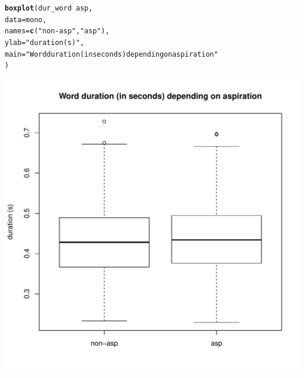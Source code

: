\documentclass[a4paper,11pt]{article}\usepackage[]{graphicx}\usepackage[]{color}
\makeatletter
\def\maxwidth{ %
  \ifdim\Gin@nat@width>\linewidth
    \linewidth
  \else
    \Gin@nat@width
  \fi
}
\newcommand{\hlstr}[1]{\textcolor[rgb]{0.192,0.494,0.8}{#1}}%
\newcommand{\hlopt}[1]{\textcolor[rgb]{0,0,0}{#1}}%
\newcommand{\hlstd}[1]{\textcolor[rgb]{0.345,0.345,0.345}{#1}}%
\newcommand{\hlkwc}[1]{\textcolor[rgb]{0.333,0.667,0.333}{#1}}%
\newcommand{\hlkwd}[1]{\textcolor[rgb]{0.737,0.353,0.396}{\textbf{#1}}}%
\newenvironment{kframe}{%
 \def\at@end@of@kframe{}%
 \ifinner\ifhmode%
  \def\at@end@of@kframe{\end{minipage}}%
  \begin{minipage}{\columnwidth}%
 \fi\fi%
 \def\FrameCommand##1{\hskip\@totalleftmargin \hskip-\fboxsep
 \colorbox{shadecolor}{##1}\hskip-\fboxsep
     \hskip-\linewidth \hskip-\@totalleftmargin \hskip\columnwidth}%
 \MakeFramed {\advance\hsize-\width
   \@totalleftmargin\z@ \linewidth\hsize
   \@setminipage}}%
 {\par\unskip\endMakeFramed%
 \at@end@of@kframe}
\newenvironment{knitrout}{}{} %
\makeatother
\begin{document}
\begin{knitrout}
\color{fgcolor}\begin{kframe}
\begin{alltt}
\hlkwd{boxplot}\hlstd{(dur_word} \hlopt{~} \hlstd{asp,}
        \hlkwc{data} \hlstd{= mono,}
        \hlkwc{names} \hlstd{=} \hlkwd{c}\hlstd{(}\hlstr{"non-asp"}\hlstd{,} \hlstr{"asp"}\hlstd{),}
        \hlkwc{ylab} \hlstd{=} \hlstr{"duration (s)"}\hlstd{,}
        \hlkwc{main} \hlstd{=} \hlstr{"Word duration (in seconds) depending on aspiration"}
        \hlstd{)}
\end{alltt}
\end{kframe}

{\centering \includegraphics[width=\maxwidth]{img/mono-box-1} 

}



\end{knitrout}
\end{document}
